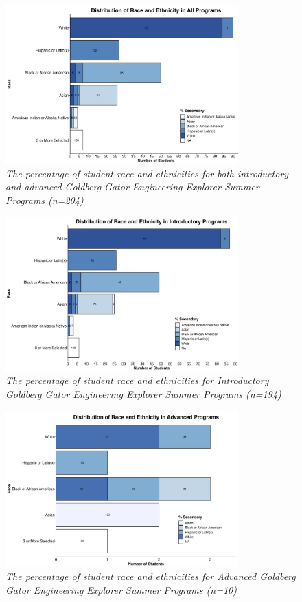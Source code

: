 \documentclass[
]{article}
\begin{document}
\begin{figure}
\centering
\includegraphics[width=0.8\textwidth,height=\textheight]{Graphs/Report/GGEE_23_Race_All.jpg}
\caption{\emph{The percentage of student race and ethnicities for both
introductory and advanced Goldberg Gator Engineering Explorer Summer
Programs (n=204)}}
\end{figure}

\begin{figure}
\centering
\includegraphics[width=0.8\textwidth,height=\textheight]{Graphs/Report/GGEE_23_Race_In.jpg}
\caption{\emph{The percentage of student race and ethnicities for
Introductory Goldberg Gator Engineering Explorer Summer Programs
(n=194)}}
\end{figure}

\begin{figure}
\centering
\includegraphics[width=0.8\textwidth,height=\textheight]{Graphs/Report/GGEE_23_Race_Adv.jpg}
\caption{\emph{The percentage of student race and ethnicities for
Advanced Goldberg Gator Engineering Explorer Summer Programs (n=10)}}
\end{figure}
\end{document}
